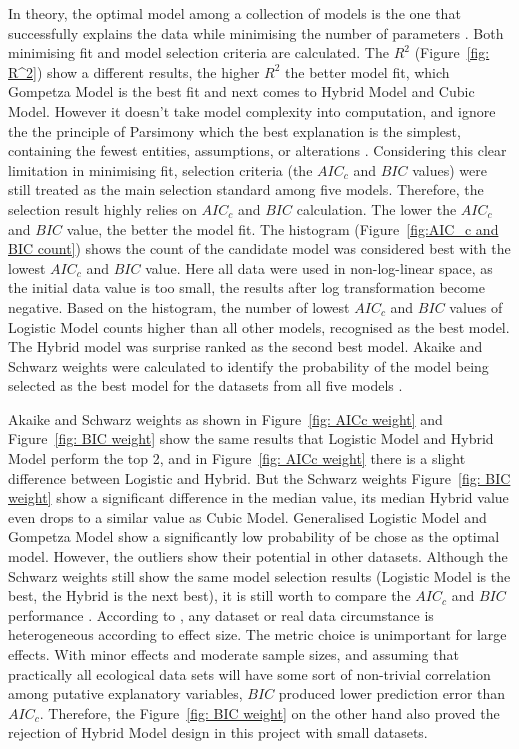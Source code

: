 \documentclass[a4paper]{report}
\begin{document}
\begin{linenumbers}
    In theory, the optimal model among a collection of models is the one that successfully explains the data while minimising the number of parameters \citep{johnson2004model}. Both minimising fit and model selection criteria are calculated. The $R^2$ (Figure~\ref{fig: R^2}) show a different results, the higher $R^2$ the better model fit, which Gompetza Model is the best fit and next comes to Hybrid Model and Cubic Model. However it doesn't take model complexity into computation, and ignore the the principle of Parsimony which the best explanation is the simplest, containing the fewest entities, assumptions, or alterations \citep{johnson2004model, coelho2019parsimonious}. Considering this clear limitation in minimising fit, selection criteria (the $AIC_c$ and $BIC$ values) were still treated as the main selection standard among five models. Therefore, the selection result highly relies on $AIC_c$ and $BIC$ calculation. The lower the $AIC_c$ and $BIC$ value, the better the model fit. The histogram (Figure~\ref{fig:AIC_c and BIC count}) shows the count of the candidate model was considered best with the lowest $AIC_c$ and $BIC$ value. Here all data were used in non-log-linear space, as the initial data value is too small, the results after log transformation become negative. Based on the histogram, the number of lowest $AIC_c$ and $BIC$ values of Logistic Model counts higher than all other models, recognised as the best model. The Hybrid model was surprise ranked as the second best model. Akaike and Schwarz weights were calculated to identify the probability of the model being selected as the best model for the datasets from all five models \citep{johnson2004model}. 

    Akaike and Schwarz weights as shown in Figure~\ref{fig: AICc weight} and Figure~\ref{fig: BIC weight} show the same results that Logistic Model and Hybrid Model perform the top 2, and in Figure~\ref{fig: AICc weight} there is a slight difference between Logistic and Hybrid. But the Schwarz weights Figure~\ref{fig: BIC weight} show a significant difference in the median value, its median Hybrid value even drops to a similar value as Cubic Model. Generalised Logistic Model and Gompetza Model show a significantly low probability of be chose as the optimal model. However, the outliers show their potential in other datasets. Although the Schwarz weights still show the same model selection results (Logistic Model is the best, the Hybrid is the next best), it is still worth to compare the $AIC_c$ and $BIC$ performance \citep{brewer2016relative, johnson2004model}. According to \citet{brewer2016relative}, any dataset or real data circumstance is heterogeneous according to effect size. The metric choice is unimportant for large effects. With minor effects and moderate sample sizes, and assuming that practically all ecological data sets will have some sort of non-trivial correlation among putative explanatory variables, $BIC$ produced lower prediction error than $AIC_c$. Therefore, the Figure~\ref{fig: BIC weight} on the other hand also proved the rejection of Hybrid Model design in this project with small datasets.


\end{linenumbers}
\end{document}
